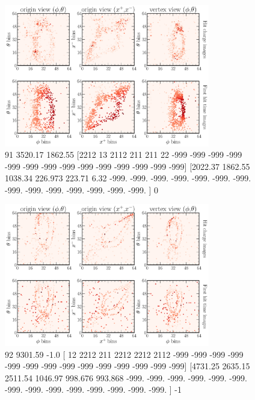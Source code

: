 \begin{figure} %
    \includegraphics[width=0.8\textwidth]{diagrams/7-cvn/chipsnet/explore_numu_ccdis_event.pdf}
    \caption[explore numu ccdis event short]
    {91
        3520.17
        1862.55
            [2212   13 2112  211  211   22 -999 -999 -999 -999 -999 -999 -999 -999
                -999 -999 -999 -999 -999 -999]
            [2022.37  1862.55  1038.34   226.973  223.71     6.32  -999.    -999.
                -999.    -999.    -999.    -999.    -999.    -999.    -999.    -999.
                -999.    -999.    -999.    -999.   ]
        0}
    \label{fig:explore_numu_ccdis_event}
\end{figure}

\begin{figure} %
    \includegraphics[width=0.8\textwidth]{diagrams/7-cvn/chipsnet/explore_nuel_ncdis_event.pdf}
    \caption[explore nuel ncdis event short]
    {92
    9301.59
    -1.0
    [  12 2212  211 2212 2212 2112 -999 -999 -999 -999 -999 -999 -999 -999
    -999 -999 -999 -999 -999 -999]
    [4731.25  2635.15  2511.54  1046.97   998.676  993.868 -999.    -999.
    -999.    -999.    -999.    -999.    -999.    -999.    -999.    -999.
    -999.    -999.    -999.    -999.   ]
    -1
    }
    \label{fig:explore_nuel_ncdis_event}
\end{figure}


